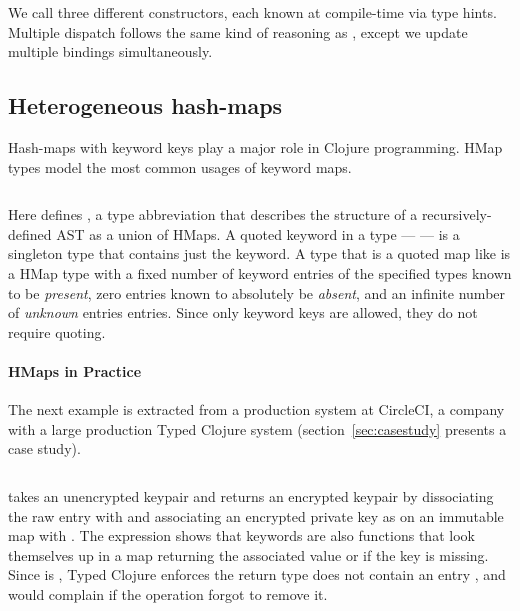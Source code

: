 We call three different  constructors, each known at compile-time
via type hints.
Multiple dispatch follows the same kind of reasoning as ,
except we update multiple bindings simultaneously.

\subsection{Heterogeneous hash-maps}

Hash-maps with keyword keys play a major role in Clojure programming.
HMap types model the most common usages of keyword maps.

\begin{exmp}
\inputminted[firstline=6,lastline=13]{clojure}{code/demo/src/demo/hmap.clj}
\label{example:decleaf}
\end{exmp}

%
Here  defines , a type abbreviation
that describes the structure of a recursively-defined AST as a union of HMaps.
A quoted keyword in a type ---  --- is a singleton type that contains just the keyword.
A type that is a quoted map like  is a
HMap type with a fixed number of keyword entries of the specified types
known to be \emph{present},
zero entries known to absolutely be \emph{absent},
and an infinite number of \emph{unknown} entries entries.
Since only keyword keys are allowed, they do not require quoting.

\paragraph{HMaps in Practice} The next example is extracted from a production system at CircleCI,
a company with a large production Typed Clojure system
(section~\ref{sec:casestudy} presents a case study).

\begin{exmp}
\inputminted[firstline=10,lastline=22]{clojure}{code/demo/src/demo/key.clj}
\label{example:circleci}
\end{exmp}

 takes an unencrypted keypair and returns an encrypted keypair by
dissociating the raw  entry with 
and associating an encrypted private key
as  on an immutable map with .
The expression  shows that keywords are also 
functions that look themselves up in a map returning the associated value or \nil{} if the key is missing.
Since  is , Typed Clojure enforces the return type
does not contain an entry , and would complain if the 
operation forgot to remove it.

